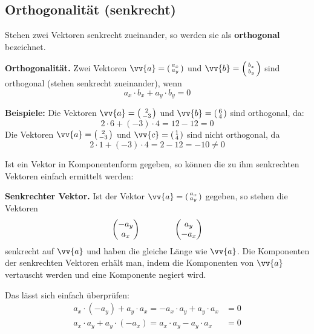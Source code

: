 \subsection{Orthogonalität (senkrecht)}

Stehen zwei Vektoren senkrecht zueinander, so werden sie als \textbf{orthogonal} bezeichnet.

\begin{theorem}
  \textbf{Orthogonalität.} Zwei Vektoren $\vv{a} = \tvec{a_{x},a_{y}}$ und $\vv{b} = \tvec{b_{x},b_{y}}$ sind orthogonal (stehen senkrecht zueinander), wenn
  \[
    a_{x}\cdot b_{x}+a_{y}\cdot b_{y} = 0
  \]
\end{theorem}

\begin{center}
\end{center}

\begin{example}
  \textbf{Beispiele:} Die Vektoren $\vv{a} = \tvec{2,-3}$ und $\vv{b} = \tvec{6,4}$ sind orthogonal, da:
  \[
    2\cdot 6 + (-3)\cdot 4 = 12 - 12 = 0
  \]
  Die Vektoren $\vv{a} = \tvec{2,-3}$ und $\vv{c} = \tvec{1,4}$ sind nicht orthogonal, da
  \[
    2\cdot 1 + (-3)\cdot 4 = 2-12 = -10 \ne 0
  \]
\end{example}

Ist ein Vektor in Komponentenform gegeben, so können die zu ihm senkrechten Vektoren einfach ermittelt werden:

\begin{theorem}
  \textbf{Senkrechter Vektor.} Ist der Vektor $\vv{a} = \tvec{a_{x},a_{y}}$ gegeben, so stehen die Vektoren
  \[
    \dvec{-a_{y},a_{x}} \qquad\qquad \dvec{a_{y},-a_{x}}
  \]
  senkrecht auf $\vv{a}$ und haben die gleiche Länge wie $\vv{a}$. Die Komponenten der senkrechten Vektoren erhält man, indem die Komponenten von $\vv{a}$ vertauscht werden und eine Komponente negiert wird.
\end{theorem}
Das lässt sich einfach überprüfen:
\begin{align*}
  a_{x}\cdot(-a_{y})+a_{y}\cdot a_{x} = -a_{x}\cdot a_{y}+a_{y}\cdot a_{x} &= 0 \\
  a_{x}\cdot a_{y}+a_{y}\cdot(-a_{x}) = a_{x}\cdot a_{y}-a_{y}\cdot a_{x} &= 0
\end{align*}

